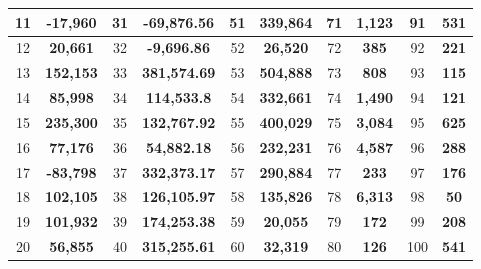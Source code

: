 \documentclass[11pt]{article}
\begin{document}
\begin{table}[h]
\begin{tabular}{|c|c||c|c||c|c||c|c||c|c|}
\hline
11 & \textbf{-17,960} & 31 & \textbf{-69,876.56} & 51 & \textbf{339,864} & 71 & \textbf{1,123} & 91 & \textbf{531} \\
\hline
12 & \textbf{20,661} & 32 & \textbf{-9,696.86} & 52 & \textbf{26,520} & 72 & \textbf{385} & 92 & \textbf{221} \\
\hline
13 & \textbf{152,153} & 33 & \textbf{381,574.69} & 53 & \textbf{504,888} & 73 & \textbf{808} & 93 & \textbf{115} \\
\hline
14 & \textbf{85,998} & 34 & \textbf{114,533.8} & 54 & \textbf{332,661} & 74 & \textbf{1,490} & 94 & \textbf{121} \\
\hline
15 & \textbf{235,300} & 35 & \textbf{132,767.92} & 55 & \textbf{400,029} & 75 & \textbf{3,084} & 95 & \textbf{625} \\
\hline
16 & \textbf{77,176} & 36 & \textbf{54,882.18} & 56 & \textbf{232,231} & 76 & \textbf{4,587} & 96 & \textbf{288} \\
\hline
17 & \textbf{-83,798} & 37 & \textbf{332,373.17} & 57 & \textbf{290,884} & 77 & \textbf{233} & 97 & \textbf{176} \\
\hline
18 & \textbf{102,105} & 38 & \textbf{126,105.97} & 58 & \textbf{135,826} & 78 & \textbf{6,313} & 98 & \textbf{50} \\
\hline
19 & \textbf{101,932} & 39 & \textbf{174,253.38} & 59 & \textbf{20,055} & 79 & \textbf{172} & 99 & \textbf{208} \\
\hline
20 & \textbf{56,855} & 40 & \textbf{315,255.61} & 60 & \textbf{32,319} & 80 & \textbf{126} & 100 & \textbf{541} \\
\hline
\end{tabular}
\end{table}
\end{document}
